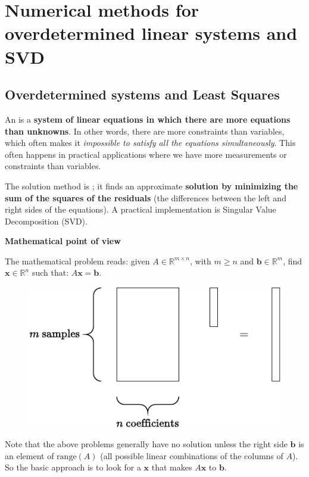 \section{Numerical methods for overdetermined linear systems and SVD}

\subsection{Overdetermined systems and Least Squares}

An  is a \textbf{system of linear equations in which there are more equations than unknowns}. In other words, there are more constraints than variables, which often makes it \emph{impossible to satisfy all the equations simultaneously}. This often happens in practical applications where we have more measurements or constraints than variables.

\highspace
The solution method is ; it finds an approximate \textbf{solution by minimizing the sum of the squares of the residuals} (the differences between the left and right sides of the equations). A practical implementation is Singular Value Decomposition (SVD).

\highspace
\begin{flushleft}
    \textcolor{Green3}{ \textbf{Mathematical point of view}}
\end{flushleft}
The mathematical problem reads: given $A \in \mathbb{R}^{m \times n}$, with $m \ge n$ and $\mathbf{b} \in \mathbb{R}^{m}$, find $\mathbf{x} \in \mathbb{R}^{n}$ such that: $A\mathbf{x} = \mathbf{b}$.

\begin{figure}[!htp]
    \centering
    \includegraphics[width=.6\textwidth]{img/overdetermined-linear-systems-1.pdf}
\end{figure}

\noindent
Note that the above problems generally have no solution unless the right side $\mathbf{b}$ is an element of $\mathrm{range}\left(A\right)$ (all possible linear combinations of the columns of $A$). So the basic approach is to look for a $\mathbf{x}$ that makes $A\mathbf{x}$  to $\mathbf{b}$.

